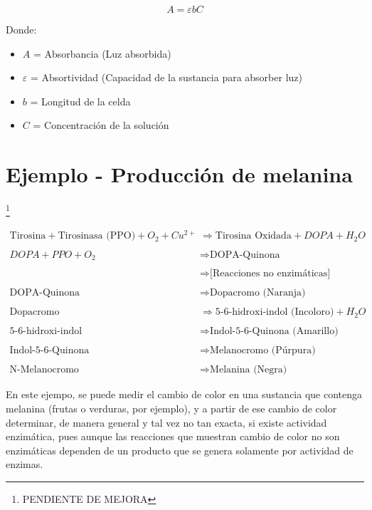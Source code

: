 \begin{equation}
    A = \varepsilon b C
\end{equation}

Donde:

\begin{itemize}
    \item $A$ = Absorbancia (Luz absorbida)
    \item $\varepsilon$ = Absortividad (Capacidad de la sustancia para absorber luz) 
    \item $b$ = Longitud de la celda
    \item $C$ = Concentración de la solución
\end{itemize}

\section{Ejemplo - Producción de melanina}\footnote{PENDIENTE DE MEJORA}

\begin{align}
    \text{Tirosina} + \text{Tirosinasa (PPO)} + O_2 + Cu^{2+} &\Longrightarrow \text{Tirosina Oxidada} + DOPA + H_2O
    \\
    \\
    DOPA + PPO + O_2 &\Longrightarrow \text{DOPA-Quinona}
    \\
    \\
    &\Longrightarrow \text{[Reacciones no enzimáticas]}
    \\
    \\
    \text{DOPA-Quinona} &\Longrightarrow \text{Dopacromo (Naranja)}
    \\
    \\
    \text{Dopacromo} &\Longrightarrow \text{5-6-hidroxi-indol (Incoloro)} + H_2O
    \\
    \\
    \text{5-6-hidroxi-indol} &\Longrightarrow \text{Indol-5-6-Quinona (Amarillo)}
    \\
    \\
    \text{Indol-5-6-Quinona} &\Longrightarrow \text{Melanocromo (Púrpura)}
    \\
    \\
    \text{N-Melanocromo} &\Longrightarrow \text{Melanina (Negra)}
\end{align}

En este ejempo, se puede medir el cambio de color en una sustancia que contenga melanina (frutas o verduras, por ejemplo), y a partir de ese cambio de color determinar, de manera general y tal vez no tan exacta, si existe actividad enzimática, pues aunque las reacciones que muestran cambio de color no son enzimáticas dependen de un producto que se genera solamente por actividad de enzimas.

